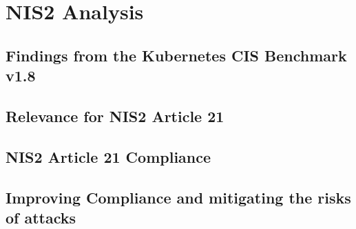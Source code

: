 %
%

\pagebreak
\section{NIS2 Analysis}

\onehalfspacing

\subsection{Findings from the Kubernetes CIS Benchmark v1.8}

\subsection{Relevance for NIS2 Article 21}

\subsection{NIS2 Article 21 Compliance}

\subsection{Improving Compliance and mitigating the risks of attacks}

